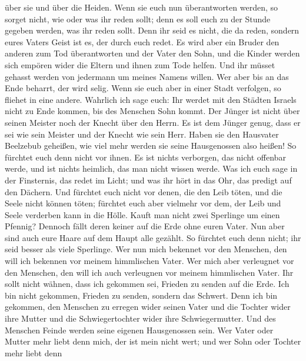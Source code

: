 über sie und über die Heiden.  Wenn sie euch nun
überantworten werden, so sorget nicht, wie oder was ihr reden sollt;
denn es soll euch zu der Stunde gegeben werden, was ihr reden sollt.
 Denn ihr seid es nicht, die da reden, sondern eures
Vaters Geist ist es, der durch euch redet.  Es wird aber
ein Bruder den anderen zum Tod überantworten und der Vater den Sohn, und
die Kinder werden sich empören wider die Eltern und ihnen zum Tode
helfen.  Und ihr müsset gehasst werden von jedermann um
meines Namens willen. Wer aber bis an das Ende beharrt, der wird selig.
 Wenn sie euch aber in einer Stadt verfolgen, so fliehet
in eine andere. Wahrlich ich sage euch: Ihr werdet mit den Städten
Israels nicht zu Ende kommen, bis des Menschen Sohn kommt.
 Der Jünger ist nicht über seinen Meister noch der Knecht
über den Herrn.  Es ist dem Jünger genug, dass er sei wie
sein Meister und der Knecht wie sein Herr. Haben sie den Hausvater
Beelzebub geheißen, wie viel mehr werden sie seine Hausgenossen also
heißen!  So fürchtet euch denn nicht vor ihnen. Es ist
nichts verborgen, das nicht offenbar werde, und ist nichts heimlich, das
man nicht wissen werde.  Was ich euch sage in der
Finsternis, das redet im Licht; und was ihr hört in das Ohr, das predigt
auf den Dächern.  Und fürchtet euch nicht vor denen, die
den Leib töten, und die Seele nicht können töten; fürchtet euch aber
vielmehr vor dem, der Leib und Seele verderben kann in die Hölle.
 Kauft man nicht zwei Sperlinge um einen Pfennig? Dennoch
fällt deren keiner auf die Erde ohne euren Vater.  Nun
aber sind auch eure Haare auf dem Haupt alle gezählt.  So
fürchtet euch denn nicht; ihr seid besser als viele Sperlinge.
 Wer nun mich bekennet vor den Menschen, den will ich
bekennen vor meinem himmlischen Vater.  Wer mich aber
verleugnet vor den Menschen, den will ich auch verleugnen vor meinem
himmlischen Vater.  Ihr sollt nicht wähnen, dass ich
gekommen sei, Frieden zu senden auf die Erde. Ich bin nicht gekommen,
Frieden zu senden, sondern das Schwert.  Denn ich bin
gekommen, den Menschen zu erregen wider seinen Vater und die Tochter
wider ihre Mutter und die Schwiegertochter wider ihre Schwiegermutter.
 Und des Menschen Feinde werden seine eigenen
Hausgenossen sein.  Wer Vater oder Mutter mehr liebt denn
mich, der ist mein nicht wert; und wer Sohn oder Tochter mehr liebt denn
